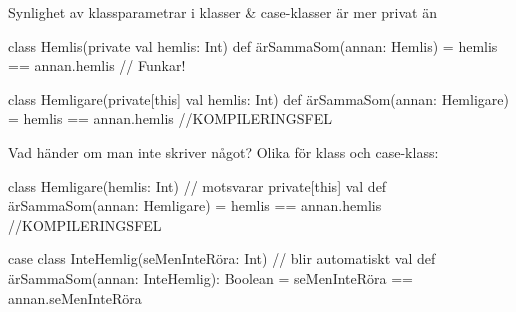 \begin{Slide}{Synlighet av klassparametrar i klasser \& case-klasser}\SlideFontSmall
{} är  mer privat än  
\begin{Code}
class Hemlis(private val hemlis: Int) {
  def ärSammaSom(annan: Hemlis) = hemlis == annan.hemlis   // Funkar!
}

class Hemligare(private[this] val hemlis: Int) {
  def ärSammaSom(annan: Hemligare) = hemlis == annan.hemlis //KOMPILERINGSFEL
}
\end{Code}
Vad händer om man inte skriver något? Olika för klass och case-klass:
\begin{Code}
class Hemligare(hemlis: Int) { // motsvarar private[this] val
  def ärSammaSom(annan: Hemligare) = hemlis == annan.hemlis //KOMPILERINGSFEL
}

case class InteHemlig(seMenInteRöra: Int) { // blir automatiskt val 
  def ärSammaSom(annan: InteHemlig): Boolean = 
    seMenInteRöra == annan.seMenInteRöra 
}

\end{Code}
\end{Slide}

\fi




